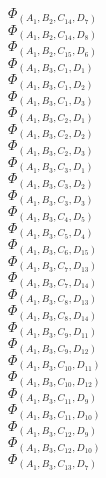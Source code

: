 \documentclass[14pt]{article}
\begin{document}
    $\Phi_{({A}_{1}, {B}_{2}, {C}_{14}, {D}_{7})}$ \\ 
    $\Phi_{({A}_{1}, {B}_{2}, {C}_{14}, {D}_{8})}$ \\ 
    $\Phi_{({A}_{1}, {B}_{2}, {C}_{15}, {D}_{6})}$ \\ 
    $\Phi_{({A}_{1}, {B}_{3}, {C}_{1}, {D}_{1})}$ \\ 
    $\Phi_{({A}_{1}, {B}_{3}, {C}_{1}, {D}_{2})}$ \\ 
    $\Phi_{({A}_{1}, {B}_{3}, {C}_{1}, {D}_{3})}$ \\ 
    $\Phi_{({A}_{1}, {B}_{3}, {C}_{2}, {D}_{1})}$ \\ 
    $\Phi_{({A}_{1}, {B}_{3}, {C}_{2}, {D}_{2})}$ \\ 
    $\Phi_{({A}_{1}, {B}_{3}, {C}_{2}, {D}_{3})}$ \\ 
    $\Phi_{({A}_{1}, {B}_{3}, {C}_{3}, {D}_{1})}$ \\ 
    $\Phi_{({A}_{1}, {B}_{3}, {C}_{3}, {D}_{2})}$ \\ 
    $\Phi_{({A}_{1}, {B}_{3}, {C}_{3}, {D}_{3})}$ \\ 
    $\Phi_{({A}_{1}, {B}_{3}, {C}_{4}, {D}_{5})}$ \\ 
    $\Phi_{({A}_{1}, {B}_{3}, {C}_{5}, {D}_{4})}$ \\ 
    $\Phi_{({A}_{1}, {B}_{3}, {C}_{6}, {D}_{15})}$ \\ 
    $\Phi_{({A}_{1}, {B}_{3}, {C}_{7}, {D}_{13})}$ \\ 
    $\Phi_{({A}_{1}, {B}_{3}, {C}_{7}, {D}_{14})}$ \\ 
    $\Phi_{({A}_{1}, {B}_{3}, {C}_{8}, {D}_{13})}$ \\ 
    $\Phi_{({A}_{1}, {B}_{3}, {C}_{8}, {D}_{14})}$ \\ 
    $\Phi_{({A}_{1}, {B}_{3}, {C}_{9}, {D}_{11})}$ \\ 
    $\Phi_{({A}_{1}, {B}_{3}, {C}_{9}, {D}_{12})}$ \\ 
    $\Phi_{({A}_{1}, {B}_{3}, {C}_{10}, {D}_{11})}$ \\ 
    $\Phi_{({A}_{1}, {B}_{3}, {C}_{10}, {D}_{12})}$ \\ 
    $\Phi_{({A}_{1}, {B}_{3}, {C}_{11}, {D}_{9})}$ \\ 
    $\Phi_{({A}_{1}, {B}_{3}, {C}_{11}, {D}_{10})}$ \\ 
    $\Phi_{({A}_{1}, {B}_{3}, {C}_{12}, {D}_{9})}$ \\ 
    $\Phi_{({A}_{1}, {B}_{3}, {C}_{12}, {D}_{10})}$ \\ 
    $\Phi_{({A}_{1}, {B}_{3}, {C}_{13}, {D}_{7})}$ \\ 
\end{document}
